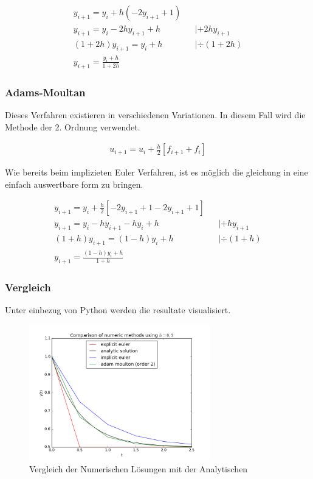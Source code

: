 \documentclass{article}
\newcommand\Section[1]{ %
  \addtocontents{toc}{\protect\setcounter{tocdepth}{0}}
  \subsubsection*{#1}
  \addtocontents{toc}{\protect\setcounter{tocdepth}{3}}}
\begin{document}
				\begin{align*}
					y_{i+1} = y_{i} + h(-2y_{i+1}+1) \\
					y_{i+1} = y_{i} - 2hy_{i+1} + h  && | +2hy_{i+1} \\
					(1+2h)y_{i+1} = y_{i} + h && | \div(1+2h) \\
					y_{i+1} =  \frac{y_{i} + h}{1+2h}
				\end{align*} 
			
			\Section{Adams-Moultan}
			
				Dieses Verfahren existieren in verschiedenen Variationen. In diesem Fall wird die Methode der 2. Ordnung verwendet.
				
				\begin{align*}
					u_{i+1} = u_{i} + \frac{h}{2}[f_{i+1} + f_{i}]
				\end{align*}
				
				Wie bereits beim implizieten Euler Verfahren, ist es möglich die gleichung in eine einfach auswertbare form zu
				bringen.
				
				\begin{align*}
					y_{i+1} = y_{i} + \frac{h}{2}[-2y_{i+1} + 1 - 2y_{i+1} + 1] \\
					y_{i+1} = y_{i} - hy_{i+1} - hy_{i} + h && | +hy_{i+1} \\
					(1+h)y_{i+1} = (1-h)y_{i} + h && | \div(1+h) \\
					y_{i+1} = \frac{(1-h)y_{i}+h}{1+h}
				\end{align*}
				
			
			\Section{Vergleich}
			
				Unter einbezug von Python werden die resultate visualisiert.
				
				\begin{figure}[htbp] 
					\centering
					\includegraphics[width=0.7\textwidth]{numeric_plots.png}
					\caption{Vergleich der Numerischen Lösungen mit der Analytischen}
					\label{fig:Bild2}
				\end{figure}
			
\end{document}
